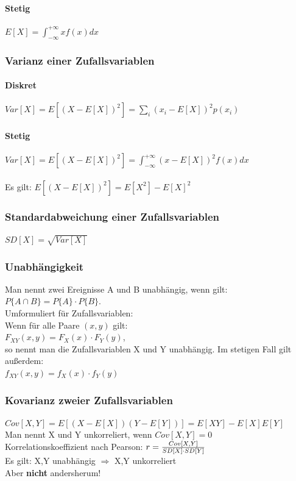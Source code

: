 \paragraph{Stetig}
$ E[X] = \int_{-\infty}^{+\infty} x f(x)dx $

\subsubsection{Varianz einer Zufallsvariablen}
\paragraph{Diskret}
$ Var[X] = E[(X-E[X])^2] = \sum_i (x_i - E[X])^2 p(x_i) $
\paragraph{Stetig}
$ Var[X] = E[(X-E[X])^2] = \int_{-\infty}^{+\infty} (x-E[X])^2 f(x)dx $ \\\\
Es gilt: $ E[(X-E[X])^2] = E[X^2] - E[X]^2 $

\subsubsection{Standardabweichung einer Zufallsvariablen}
$ SD[X] = \sqrt{Var[X]} $

\subsubsection{Unabhängigkeit}
Man nennt zwei Ereignisse A und B unabhängig, wenn gilt: \\
$ P\{ A \cap B \} = P\{ A \} \cdot P\{ B \} $. \\
Umformuliert für Zufallsvariablen: \\
Wenn für alle Paare $(x,y)$ gilt: \\
$ F_{XY}(x,y) = F_X(x) \cdot F_Y(y) $, \\
so nennt man die Zufallsvariablen X und Y unabhängig. Im stetigen Fall gilt außerdem: \\
$ f_{XY}(x,y) = f_X(x) \cdot f_Y(y) $

\subsubsection{Kovarianz zweier Zufallsvariablen}
$ Cov[X,Y] = E[(X-E[X])(Y-E[Y])] = E[XY] - E[X]E[Y] $ \\
Man nennt X und Y unkorreliert, wenn $ Cov[X,Y] = 0 $ \\
Korrelationskoeffizient nach Pearson: $ r = {Cov[X,Y] \over SD[X] \cdot SD[Y]} $ \\
Es gilt: X,Y unabhängig $\Rightarrow$ X,Y unkorreliert \\
Aber \textbf{nicht} andersherum!

